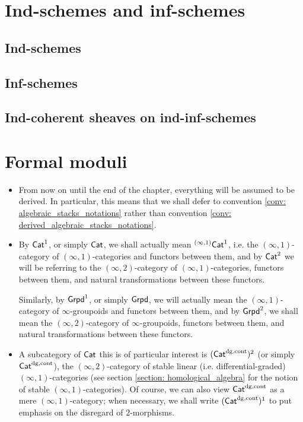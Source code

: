     \section{Ind-schemes and inf-schemes}
        \subsection{Ind-schemes}
        
        \subsection{Inf-schemes}
        
        \subsection{Ind-coherent sheaves on ind-inf-schemes}
        
    \section{Formal moduli}
        \begin{convention} \label{conv: moduli_everything_is_derived}
            \noindent
            \begin{itemize}
                \item From now on until the end of the chapter, everything will be assumed to be derived. In particular, this means that we shall defer to convention \ref{conv: algebraic_stacks_notations} rather than convention \ref{conv: derived_algebraic_stacks_notations}.
                \item By $\mathsf{Cat}^1$, or simply $\mathsf{Cat}$, we shall actually mean ${}^{(\infty, 1)}\mathsf{Cat}^1$, i.e. the $(\infty, 1)$-category of $(\infty, 1)$-categories and functors between them, and by $\mathsf{Cat}^2$ we will be referring to the $(\infty, 2)$-category of $(\infty, 1)$-categories, functors between them, and natural transformations between these functors. 
                
                Similarly, by $\mathsf{Grpd}^1$, or simply $\mathsf{Grpd}$, we will actually mean the $(\infty, 1)$-category of $\infty$-groupoids and functors between them, and by $\mathsf{Grpd}^2$, we shall mean the $(\infty, 2)$-category of $\infty$-groupoids, functors between them, and natural transformations between these functors.
                \item A subcategory of $\mathsf{Cat}$ this is of particular interest is $(\mathsf{Cat}^{\mathrm{dg}, \mathrm{cont}})^2$ (or simply $\mathsf{Cat}^{\mathrm{dg}, \mathrm{cont}}$), the $(\infty, 2)$-category of stable linear (i.e. differential-graded) $(\infty, 1)$-categories (see section \ref{section: homological_algebra} for the notion of stable $(\infty, 1)$-categories). Of course, we can also view $\mathsf{Cat}^{\mathrm{dg}, \mathrm{cont}}$ as a mere $(\infty, 1)$-category; when necessary, we shall write $(\mathsf{Cat}^{\mathrm{dg}, \mathrm{cont}})^1$ to put emphasis on the disregard of $2$-morphisms.
            \end{itemize} 
        \end{convention}
    
